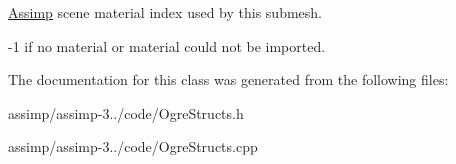 \hyperlink{class_assimp}{Assimp} scene material index used by this submesh. 

-\/1 if no material or material could not be imported. 

The documentation for this class was generated from the following files\+:\begin{DoxyCompactItemize}
\item 
assimp/assimp-\/3../code/Ogre\+Structs.\+h\item 
assimp/assimp-\/3../code/Ogre\+Structs.\+cpp\end{DoxyCompactItemize}
